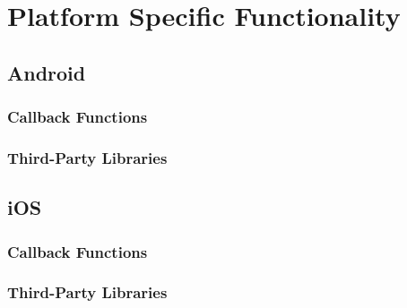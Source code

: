 \chapter{Platform Specific Functionality}\label{ch:ui}

\section{Android}

\subsection{Callback Functions}\label{callback:and}

\subsection{Third-Party Libraries}



\section{iOS}

\subsection{Callback Functions}\label{callback:ios}

\subsection{Third-Party Libraries}